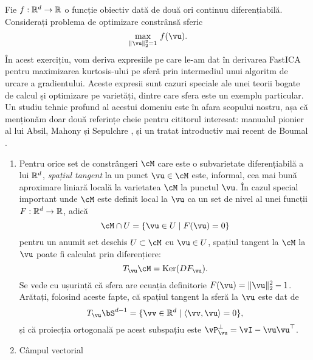 \documentclass[../../book-main_ro.tex]{subfiles}
\begin{document}
\begin{exercise}\label{exercise:sphere-calculus}
    Fie $f : \mathbb{R}^d \to \mathbb{R}$ o funcție obiectiv dată de două ori continuu diferențiabilă. Considerați problema de optimizare constrânsă sferic
    \begin{equation}\label{eq:exercise-sphere-constrained-max}
        \max_{\norm{\vu}_2^2 = 1}\, f(\vu). 
    \end{equation}
    În acest exercițiu, vom deriva expresiile pe care le-am dat în derivarea FastICA pentru maximizarea kurtosis-ului pe sferă prin intermediul unui algoritm de urcare a gradientului.
    Aceste expresii sunt cazuri speciale ale unei teorii bogate de calcul și optimizare pe varietăți, dintre care sfera este un exemplu particular. Un studiu tehnic profund al acestui domeniu este în afara scopului nostru, așa că menționăm doar două referințe cheie pentru cititorul interesat: manualul pionier al lui Absil, Mahony și Sepulchre
    \cite{Absil2009-nc}, și un tratat introductiv mai recent de Boumal \cite{Boumal2023-rj}.
    \begin{enumerate}
        \item Pentru orice set de constrângeri $\cM$ care este o subvarietate diferențiabilă a lui $\mathbb{R}^d$,
        \textit{spațiul tangent} la un punct $\vu \in \cM$ este, informal, cea mai bună aproximare liniară locală la varietatea $\cM$ la punctul $\vu$.
        În cazul special important unde $\cM$ este definit local la $\vu$ ca un set de nivel al unei funcții $F : \mathbb{R}^d \to \mathbb{R}$,
        adică
        \begin{equation*}
            \cM \cap U = \set{\vu \in U \given F(\vu) = 0}
        \end{equation*}
        pentru un anumit set deschis $U \subset \cM$ cu $\vu \in U$,
        spațiul tangent la $\cM$ la $\vu$ poate fi calculat
        prin diferențiere:
        \begin{equation*}
            T_{\vu} \cM = \Ker(DF_{\vu}).
        \end{equation*}
        Se vede cu ușurință că sfera are ecuația definitorie $F(\vu) = \norm{\vu}_2^2 - 1$.
        Arătați, folosind aceste fapte, că spațiul tangent la sferă la $\vu$ este dat de
        \begin{equation*}
            T_{\vu} \bS^{d-1} = \set{\vv \in \R^d \given \ip{\vv}{\vu} = 0},
        \end{equation*}
        și că proiecția ortogonală pe acest subspațiu este $\vP_{\vu}^\perp = \vI - \vu\vu^\top$.
        \item Câmpul vectorial

\end{enumerate}
\end{exercise}
\end{document}
